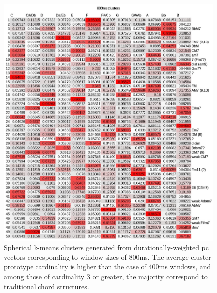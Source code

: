 \begin{figure}
	\centering
	\includegraphics[width=6.5in]{800clusters.jpg}
	\caption{Spherical k-means clusters generated from durationally-weighted pc vectors corresponding to window sizes of 800ms.  The average cluster prototype cardinality is higher than the case of 400ms windows, and among those of cardinality 3 or greater, the majority correspond to traditional chord structures.}
	\label{800clusters}
\end{figure}

